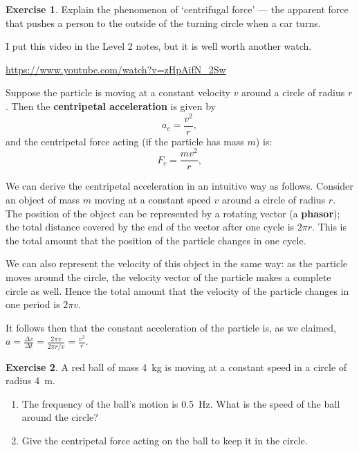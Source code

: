 \documentclass[a4paper]{amsbook}
\newcommand{\goandwatch}[1]{
\begin{center}
\begin{tcolorbox}[width=0.8\textwidth,colback={SkyBlue!20},title={\textbf{Go and watch...}},colbacktitle=MidnightBlue,coltitle=White]
  \textcolor{MidnightBlue}{\url{#1}}
\end{tcolorbox}
\end{center}}
\theoremstyle{definition}
\newtheorem{exercise}{Exercise}
\numberwithin{exercise}{chapter}
\numberwithin{exercise}{chapter}
\begin{document}
\begin{exercise}
  Explain the phenomenon of `centrifugal force' --- the apparent force that pushes a person to the outside of the
  turning circle when a car turns.
\end{exercise}

I put this video in the Level 2 notes, but it is well worth another watch.
\goandwatch{https://www.youtube.com/watch?v=zHpAifN_2Sw}

Suppose the particle is moving at a constant velocity $ v $ around a circle of radius $ r $. Then the \textbf{centripetal
acceleration} is given by
\begin{equation}
  a_c = \frac{v^2}{r},
\end{equation}
and the centripetal force acting (if the particle has mass $ m $) is:
\begin{equation}
  F_c = \frac{mv^2}{r},
\end{equation}

We can derive the centripetal acceleration in an intuitive way as follows. Consider an object of mass $ m $ moving at a constant speed $ v $ around a
circle of radius $ r $. The position of the object can be represented by a rotating vector (a \textbf{phasor}); the total distance covered by the end
of the vector after one cycle is $ 2 \pi r $. This is the total amount that the position of the particle changes in one cycle.

We can also represent the velocity of this object in the same way: as the particle moves around the circle, the velocity
vector of the particle makes a complete circle as well. Hence the total amount that the velocity of the particle changes
in one period is $ 2\pi v $.

It follows then that the constant acceleration of the particle is, as we claimed, $ a = \frac{\Delta v}{\Delta t} = \frac{2\pi v}{2\pi r / v} = \frac{v^2}{r} $.

\begin{exercise}
  A red ball of mass \SI{4}{\kilo\gram} is moving at a constant speed in a circle of radius \SI{4}{\metre}.
  \begin{enumerate}
    \item The frequency of the ball's motion is \SI{0.5}{\hertz}. What is the speed of the ball around the circle?
    \item Give the centripetal force acting on the ball to keep it in the circle.
  \end{enumerate}
\end{exercise}
\end{document}
